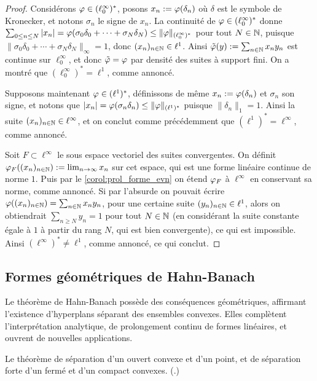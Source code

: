\begin{proof}
Considérons $\varphi \in (\ell_0^\infty)^*$, posons $x_n := \varphi(\delta_n)$ où $\delta$ est le symbole de Kronecker, et notons $\sigma_n$ le signe de $x_n$.
La continuité de $\varphi\in (\ell^\infty_0)^*$ donne $\sum_{0 \leq n \leq N} |x_n| = \varphi(\sigma_0 \delta_0+\cdots+ \sigma_N\delta_N) \leq \|\varphi\|_{(\ell^\infty_0)^*}$ pour tout $N\in \mathbb{N}$, puisque $\|\sigma_0 \delta_0+\cdots+ \sigma_N\delta_N\|_\infty = 1$, donc $(x_n)_{n\in \mathbb{N}} \in \ell^1$. 
Ainsi  $\tilde {\varphi}(y) := \sum_{n\in \mathbb{N}} x_n y_n$ est continue sur $\ell_0^\infty$, et donc $\tilde {\varphi} = \varphi$ par densité des suites à support fini. On a montré que $(\ell_0^\infty)^* = \ell^1$, comme annoncé.

Supposons maintenant $\varphi\in (\ell^1)^*$, définissons de même $x_n := \varphi(\delta_n)$ et $\sigma_n$ son signe, et notons que $|x_n| = \varphi(\sigma_n \delta_n) \leq \|\varphi\|_{(\ell^1)^*}$ puisque $\|\delta_n\|_1 = 1$. Ainsi la suite $(x_n)_{n \in \mathbb{N}} \in \ell^\infty$, et on conclut comme précédemment que $(\ell^1)^* = \ell^\infty$, comme annoncé. 

Soit $F \subset \ell^\infty$ le sous espace vectoriel des suites convergentes. On définit $\varphi_F((x_n)_{n \in \mathbb{N}}) := \lim_{n \to \infty} x_n$ sur cet espace, qui est une forme linéaire continue de norme $1$. Puis par le \cref{corol:prol_forme_evn} on étend $\varphi_F$ à $\ell^\infty$ en conservant sa norme, comme annoncé.
Si par l'absurde on pouvait écrire $\varphi( (x_n)_{n\in \mathbb{N}}) = \sum_{n\in \mathbb{N}} x_n y_n$, pour une certaine suite $(y_n)_{n \in \mathbb{N}} \in \ell^1$, alors on obtiendrait $\sum_{n \geq N} y_n = 1$ pour tout $N\in \mathbb{N}$ (en considérant la suite constante égale à $1$ à partir du rang $N$, qui est bien convergente), ce qui est impossible. Ainsi $(\ell^\infty)^* \neq \ell^1$, comme annoncé, ce qui conclut.
\end{proof}


\subsection{Formes géométriques de Hahn-Banach}
\label{subsec:HahnBanachGeom}

Le théorème de Hahn-Banach possède des conséquences géométriques, affirmant l'existence d'hyperplans séparant des ensembles convexes. Elles complètent l'interprétation analytique, de prolongement continu de formes linéaires, et ouvrent de nouvelles applications.

\begin{retenir}
Le théorème de séparation d'un ouvert convexe et d'un point, et de séparation forte d'un fermé et d'un compact convexes.
(.)
\end{retenir}

